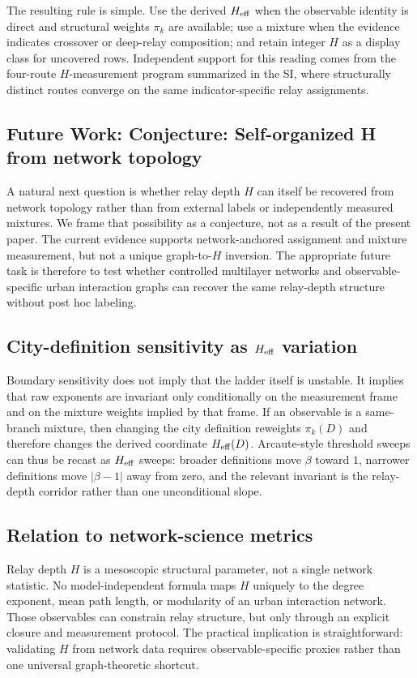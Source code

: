 The resulting rule is simple. Use the derived $H_{\mathrm{eff}}$ when the
observable identity is direct and structural weights $\pi_k$ are available; use a
mixture when the evidence indicates crossover or deep-relay composition; and
retain integer $H$ as a display class for uncovered rows. Independent support
for this reading comes from the four-route $H$-measurement program summarized
in the SI, where structurally distinct routes converge on the same
indicator-specific relay assignments.

\subsection{Future Work: Conjecture: Self-organized H from network topology}
\label{subsec:H_selforg_conjecture}
A natural next question is whether relay depth $H$ can itself be recovered
from network topology rather than from external labels or independently measured
mixtures. We frame that possibility as a conjecture, not as a result of the
present paper. The current evidence supports network-anchored assignment and
mixture measurement, but not a unique graph-to-$H$ inversion. The appropriate
future task is therefore to test whether controlled multilayer networks and
observable-specific urban interaction graphs can recover the same relay-depth
structure without post hoc labeling.

\subsection{City-definition sensitivity as \(H_{\mathrm{eff}}\) variation}
Boundary sensitivity does not imply that the ladder itself is unstable. It
implies that raw exponents are invariant only conditionally on the measurement
frame and on the mixture weights implied by that frame. If an observable is a
same-branch mixture, then changing the city definition reweights $\pi_k(D)$
and therefore changes the derived coordinate $H_{\mathrm{eff}}(D)$. Arcaute-style
threshold sweeps can thus be recast as $H_{\mathrm{eff}}$ sweeps: broader definitions
move $\beta$ toward $1$, narrower definitions move $|\beta-1|$ away from
zero, and the relevant invariant is the relay-depth corridor rather than one
unconditional slope.

\subsection{Relation to network-science metrics}
Relay depth $H$ is a mesoscopic structural parameter, not a single network
statistic. No model-independent formula maps $H$ uniquely to the degree
exponent, mean path length, or modularity of an urban interaction network.
Those observables can constrain relay structure, but only through an explicit
closure and measurement protocol. The practical implication is straightforward:
validating $H$ from network data requires observable-specific proxies rather
than one universal graph-theoretic shortcut.

